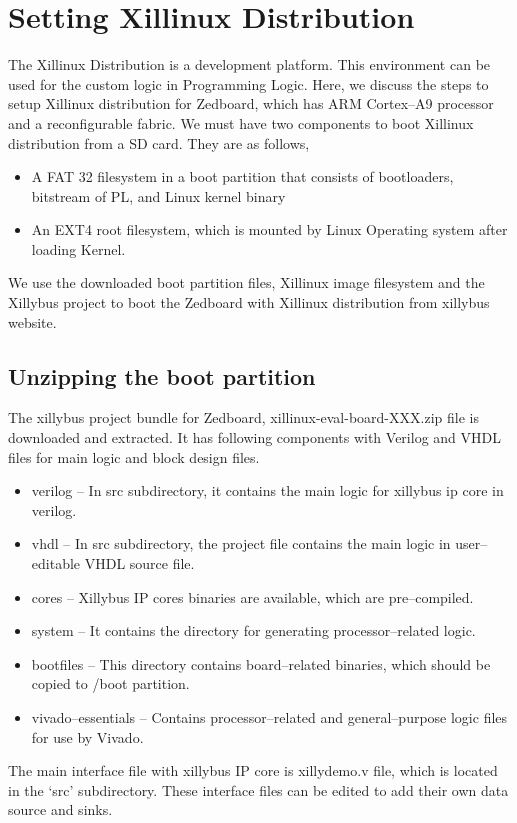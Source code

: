 \section{Setting Xillinux Distribution}
The Xillinux Distribution is a development platform. This environment can be used for the custom logic in Programming Logic. Here, we discuss the steps to setup Xillinux distribution for Zedboard, which has ARM Cortex--A9 processor and a reconfigurable fabric. We must have two components to boot Xillinux distribution from a SD card. They are as follows,
\begin{itemize}\itemsep0em 
\item A FAT 32 filesystem in a boot partition that consists of bootloaders, bitstream of PL, and Linux kernel binary
\item An EXT4 root filesystem, which is mounted by Linux Operating system after loading Kernel.
\end{itemize}
We use the downloaded boot partition files, Xillinux image filesystem and the Xillybus project to boot the Zedboard with Xillinux distribution from xillybus website. 

\subsection{Unzipping the boot partition}
The xillybus project bundle for Zedboard, xillinux-eval-board-XXX.zip file is downloaded and extracted. It has following components with Verilog and VHDL files for main logic and block design files.
\begin{itemize}\itemsep0em 
\item verilog -- In src subdirectory, it contains the main logic for xillybus ip core in verilog.
\item vhdl -- In src subdirectory, the project file contains the main logic in user--editable VHDL source file.
\item cores -- Xillybus IP cores binaries are available, which are pre--compiled.
\item system -- It contains the directory for generating processor--related logic.
\item bootfiles -- This directory contains board--related binaries, which should be copied to /boot partition.
\item vivado--essentials – Contains processor--related and general--purpose logic files for use by Vivado.
\end{itemize}
The main interface file with xillybus IP core is xillydemo.v file, which is located in the ‘src’ subdirectory. These interface files can be edited to add their own data source and sinks. 


